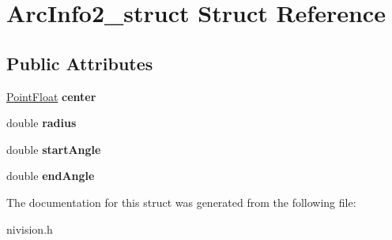 \hypertarget{structArcInfo2__struct}{\section{\-Arc\-Info2\-\_\-struct \-Struct \-Reference}
\label{structArcInfo2__struct}
}
\subsection*{\-Public \-Attributes}
\begin{DoxyCompactItemize}
\item 
\hypertarget{structArcInfo2__struct_a79887a50ef8d0c95d01acdfbeb68bd0c}{\hyperlink{structPointFloat__struct}{\-Point\-Float} {\bfseries center}}\label{structArcInfo2__struct_a79887a50ef8d0c95d01acdfbeb68bd0c}

\item 
\hypertarget{structArcInfo2__struct_ac6c9a6321d2b87742a0c6fe247e1a413}{double {\bfseries radius}}\label{structArcInfo2__struct_ac6c9a6321d2b87742a0c6fe247e1a413}

\item 
\hypertarget{structArcInfo2__struct_a94f6cf252ed4af96cbb75d609bac1be3}{double {\bfseries start\-Angle}}\label{structArcInfo2__struct_a94f6cf252ed4af96cbb75d609bac1be3}

\item 
\hypertarget{structArcInfo2__struct_ae5e66e315b5567390899bc7846fccae9}{double {\bfseries end\-Angle}}\label{structArcInfo2__struct_ae5e66e315b5567390899bc7846fccae9}

\end{DoxyCompactItemize}


\-The documentation for this struct was generated from the following file\-:\begin{DoxyCompactItemize}
\item 
nivision.\-h\end{DoxyCompactItemize}
